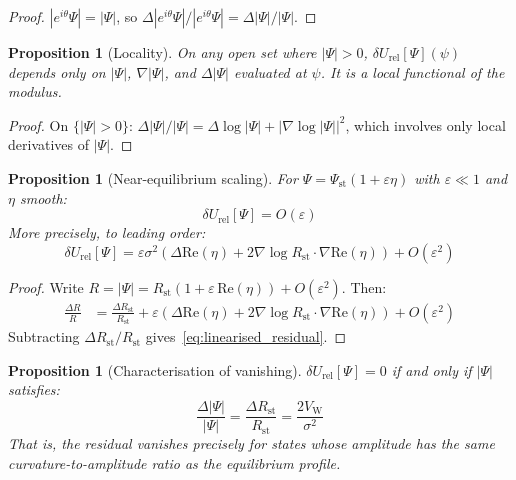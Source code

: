 \documentclass[12pt]{article}
\newtheorem{proposition}[theorem]{Proposition}
\newcommand{\VW}{V_{\mathrm{W}}}
\newcommand{\Rst}{R_{\mathrm{st}}}
\newcommand{\dUrel}{\delta U_{\mathrm{rel}}}
\begin{document}
\begin{proof}
$|e^{i\theta}\Psi| = |\Psi|$, so $\Delta|e^{i\theta}\Psi|/|e^{i\theta}\Psi| = \Delta|\Psi|/|\Psi|$.
\end{proof}

\begin{proposition}[Locality]\label{prop:locality}
On any open set where $|\Psi| > 0$, $\dUrel[\Psi](\psi)$ depends only on $|\Psi|$, $\nabla|\Psi|$, and $\Delta|\Psi|$ evaluated at $\psi$. It is a local functional of the modulus.
\end{proposition}

\begin{proof}
On $\{|\Psi| > 0\}$: $\Delta|\Psi|/|\Psi| = \Delta\log|\Psi| + |\nabla\log|\Psi||^2$, which involves only local derivatives of $|\Psi|$.
\end{proof}

\begin{proposition}[Near-equilibrium scaling]\label{prop:scaling}
For $\Psi = \Psi_{\mathrm{st}}(1 + \varepsilon\eta)$ with $\varepsilon \ll 1$ and $\eta$ smooth:
\begin{equation}
    \dUrel[\Psi] = O(\varepsilon)
\end{equation}
More precisely, to leading order:
\begin{equation}\label{eq:linearised_residual}
    \dUrel[\Psi] = \varepsilon\sigma^2\left(\Delta\mathrm{Re}(\eta) + 2\nabla\log\Rst\cdot\nabla\mathrm{Re}(\eta)\right) + O(\varepsilon^2)
\end{equation}
\end{proposition}

\begin{proof}
Write $R = |\Psi| = \Rst(1 + \varepsilon\,\mathrm{Re}(\eta)) + O(\varepsilon^2)$. Then:
\begin{align}
    \frac{\Delta R}{R} &= \frac{\Delta\Rst}{\Rst} + \varepsilon\left(\Delta\mathrm{Re}(\eta) + 2\nabla\log\Rst\cdot\nabla\mathrm{Re}(\eta)\right) + O(\varepsilon^2)
\end{align}
Subtracting $\Delta\Rst/\Rst$ gives~\eqref{eq:linearised_residual}.
\end{proof}

\begin{proposition}[Characterisation of vanishing]\label{prop:vanishing_class}
$\dUrel[\Psi] = 0$ if and only if $|\Psi|$ satisfies:
\begin{equation}
    \frac{\Delta|\Psi|}{|\Psi|} = \frac{\Delta\Rst}{\Rst} = \frac{2\VW}{\sigma^2}
\end{equation}
That is, the residual vanishes precisely for states whose amplitude has the same curvature-to-amplitude ratio as the equilibrium profile.
\end{proposition}
\end{document}
